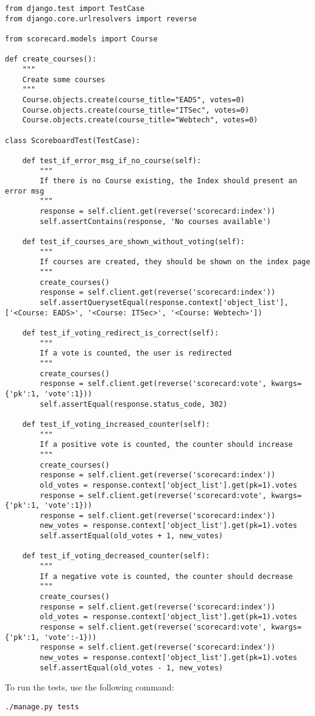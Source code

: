\begin{lstlisting}[style=Python, caption=scorecard/tests.py, label=lst:tests.py]
from django.test import TestCase
from django.core.urlresolvers import reverse

from scorecard.models import Course

def create_courses():
    """
    Create some courses
    """
    Course.objects.create(course_title="EADS", votes=0)
    Course.objects.create(course_title="ITSec", votes=0)
    Course.objects.create(course_title="Webtech", votes=0)

class ScoreboardTest(TestCase):

    def test_if_error_msg_if_no_course(self):
        """
        If there is no Course existing, the Index should present an error msg
        """
        response = self.client.get(reverse('scorecard:index'))
        self.assertContains(response, 'No courses available')

    def test_if_courses_are_shown_without_voting(self):
        """
        If courses are created, they should be shown on the index page
        """
        create_courses()
        response = self.client.get(reverse('scorecard:index'))
        self.assertQuerysetEqual(response.context['object_list'], ['<Course: EADS>', '<Course: ITSec>', '<Course: Webtech>'])

    def test_if_voting_redirect_is_correct(self):
        """
        If a vote is counted, the user is redirected
        """
        create_courses()
        response = self.client.get(reverse('scorecard:vote', kwargs={'pk':1, 'vote':1}))
        self.assertEqual(response.status_code, 302)

    def test_if_voting_increased_counter(self):
        """
        If a positive vote is counted, the counter should increase
        """
        create_courses()
        response = self.client.get(reverse('scorecard:index'))
        old_votes = response.context['object_list'].get(pk=1).votes
        response = self.client.get(reverse('scorecard:vote', kwargs={'pk':1, 'vote':1}))
        response = self.client.get(reverse('scorecard:index'))
        new_votes = response.context['object_list'].get(pk=1).votes
        self.assertEqual(old_votes + 1, new_votes)

    def test_if_voting_decreased_counter(self):
        """
        If a negative vote is counted, the counter should decrease
        """
        create_courses()
        response = self.client.get(reverse('scorecard:index'))
        old_votes = response.context['object_list'].get(pk=1).votes
        response = self.client.get(reverse('scorecard:vote', kwargs={'pk':1, 'vote':-1}))
        response = self.client.get(reverse('scorecard:index'))
        new_votes = response.context['object_list'].get(pk=1).votes
        self.assertEqual(old_votes - 1, new_votes)
\end{lstlisting}

To run the tests, use the following command:
\begin{lstlisting}[style=Bash, caption=Run tests, label=lst:run_tests]
./manage.py tests
\end{lstlisting}